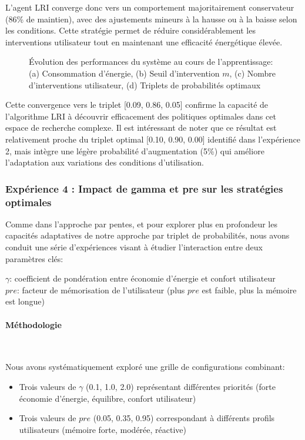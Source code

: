 L'agent LRI converge donc vers un comportement majoritairement conservateur (86\% de maintien), avec des ajustements mineurs à la hausse ou à la baisse selon les conditions. Cette stratégie permet de réduire considérablement les interventions utilisateur tout en maintenant une efficacité énergétique élevée.

\begin{figure}[h]
    \centering
    \caption{Évolution des performances du système au cours de l'apprentissage: (a) Consommation d'énergie, (b) Seuil d'intervention $m$, (c) Nombre d'interventions utilisateur, (d) Triplets de probabilités optimaux}
    \label{fig:evolution_triplets}
\end{figure}

Cette convergence vers le triplet [0.09, 0.86, 0.05] confirme la capacité de l'algorithme LRI à découvrir efficacement des politiques optimales dans cet espace de recherche complexe. Il est intéressant de noter que ce résultat est relativement proche du triplet optimal [0.10, 0.90, 0.00] identifié dans l'expérience 2, mais intègre une légère probabilité d'augmentation (5\%) qui améliore l'adaptation aux variations des conditions d'utilisation.
\subsubsection{Expérience 4 : Impact de gamma et pre sur les stratégies optimales}

Comme dans l'approche par pentes, et pour explorer plus en profondeur les capacités adaptatives de notre approche par triplet de probabilités, nous avons conduit une série d'expériences visant à étudier l'interaction entre deux paramètres clés:

$\gamma$: coefficient de pondération entre économie d'énergie et confort utilisateur\\
$pre$: facteur de mémorisation de l'utilisateur (plus $pre$ est faible, plus la mémoire est longue)

\paragraph{Méthodologie}\

Nous avons systématiquement exploré une grille de configurations combinant: 
\begin{itemize} 
    \item Trois valeurs de $\gamma$ (0.1, 1.0, 2.0) représentant différentes priorités (forte économie d'énergie, équilibre, confort utilisateur) 
    \item Trois valeurs de $pre$ (0.05, 0.35, 0.95) correspondant à différents profils utilisateurs (mémoire forte, modérée, réactive) 
\end{itemize}

